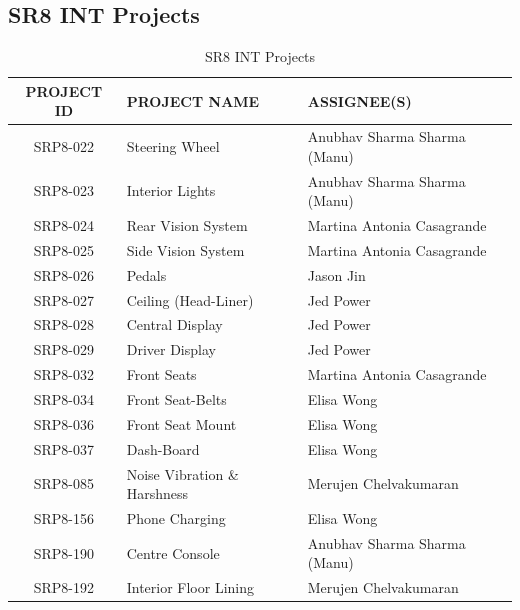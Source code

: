     \newpage
    \subsection{SR8 INT Projects}
        \begin{table}[h]
            \centering
            \renewcommand{\arraystretch}{1.2}
            \begin{tabularx}{\textwidth}{|c|X|X|}
            \hline
            \textbf{PROJECT ID} & \textbf{PROJECT NAME} & \textbf{ASSIGNEE(S)} \\
            \hline
            SRP8-022 & Steering Wheel & Anubhav Sharma Sharma (Manu) \\
            SRP8-023 & Interior Lights & Anubhav Sharma Sharma (Manu) \\
            SRP8-024 & Rear Vision System & Martina Antonia Casagrande \\
            SRP8-025 & Side Vision System & Martina Antonia Casagrande \\
            SRP8-026 & Pedals & Jason Jin \\
            SRP8-027 & Ceiling (Head-Liner) & Jed Power \\
            SRP8-028 & Central Display & Jed Power \\
            SRP8-029 & Driver Display & Jed Power \\
            SRP8-032 & Front Seats & Martina Antonia Casagrande \\
            SRP8-034 & Front Seat-Belts & Elisa Wong \\
            SRP8-036 & Front Seat Mount & Elisa Wong \\
            SRP8-037 & Dash-Board & Elisa Wong \\
            SRP8-085 & Noise Vibration \& Harshness & Merujen Chelvakumaran \\
            SRP8-156 & Phone Charging & Elisa Wong \\
            SRP8-190 & Centre Console & Anubhav Sharma Sharma (Manu) \\
            SRP8-192 & Interior Floor Lining & Merujen Chelvakumaran \\
            \hline
            \end{tabularx}
            \caption{SR8 INT Projects}
            \label{tab:int-projects}
        \end{table}

